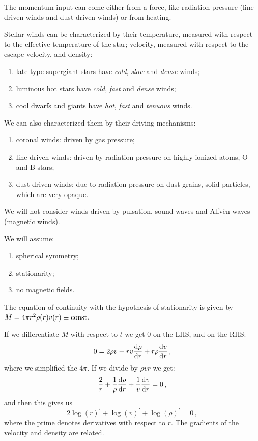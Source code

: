 \documentclass[main.tex]{subfiles}
\begin{document}

The momentum input can come either from a force, like radiation pressure (line driven winds and dust driven winds) or from heating.

Stellar winds can be characterized by their temperature, measured with respect to the effective temperature of the star; velocity, measured with respect to the escape velocity, and density: 
\begin{enumerate}
  \item late type supergiant stars have \emph{cold},  \emph{slow} and \emph{dense} winds;
  \item luminous hot stars have \emph{cold}, \emph{fast} and \emph{dense} winds;
  \item cool dwarfs and giants have \emph{hot}, \emph{fast} and \emph{tenuous} winds.
\end{enumerate}

We can also characterized them by their driving mechanisms:
\begin{enumerate}
    \item coronal winds: driven by gas pressure;
    \item line driven winds: driven by radiation pressure on highly ionized atoms, O and B stars;
    \item dust driven winds: due to radiation pressure on dust grains, solid particles, which are very opaque.
\end{enumerate}


We will not consider winds driven by pulsation, sound waves and Alfvèn waves (magnetic winds).

We will assume:
\begin{enumerate}
    \item spherical symmetry;
    \item stationarity;
    \item no magnetic fields.
\end{enumerate}

The equation of continuity with the hypothesis of stationarity is given by \(\dot{M} = 4 \pi r^2 \rho (r) v(r) \equiv \text{const}\).

If we differentiate \(\dot{M} \) with respect to \(t\) we get 0 on the LHS, and on the RHS: 
%
\begin{equation}
  0 = 2 \rho v + rv \dv{\rho }{r} + r \rho \dv{v}{r} 
\,,
\end{equation}
%
where we simplified the \(4 \pi \). If we divide by \(\rho v r \) we get: 
%
\begin{equation}
  \frac{2}{r} + \frac{1}{\rho }\dv{\rho }{r} + \frac{1}{v} \dv{v}{r} =0     
\,,
\end{equation}
%
and then this gives us 
%
\begin{equation}
  2\log(r)^{\prime } + \log(v)^{\prime } + \log(\rho)^{\prime } =0
\,,
\end{equation}
%
where the prime denotes derivatives with respect to \(r\).
The gradients of the velocity and density are related.
\end{document}
